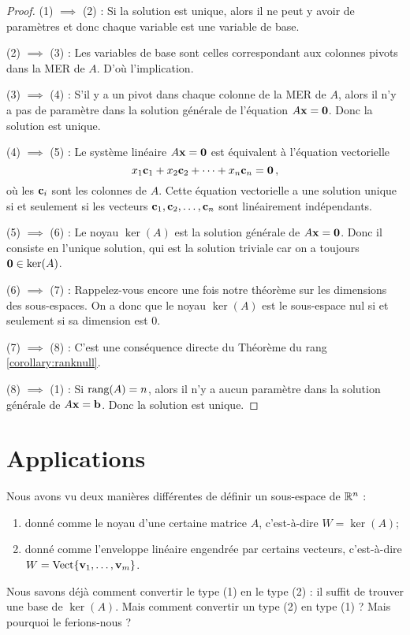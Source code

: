 \begin{proof}
(1) $\implies$ (2) : Si la solution est unique, alors il ne peut y avoir de paramètres et donc chaque variable est une variable de base.

(2) $\implies$ (3) : Les variables de base sont celles correspondant aux colonnes pivots dans la MER de $A$. D'où l'implication.

(3) $\implies$ (4) : S'il y a un pivot dans chaque colonne de la MER de $A$, alors il n'y a pas de paramètre dans la solution générale de l'équation $A\mathbf{x} = \mathbf{0}$. Donc la solution est unique.


(4) $\implies$ (5) : Le système linéaire $A\mathbf{x} = \mathbf{0}$ est \'equivalent à l'équation vectorielle
$$
x_1 \mathbf{c}_1 + x_2\mathbf{c}_2+ \cdots + x_n\mathbf{c}_n = \mathbf{0}\,,
$$
où les $\mathbf{c}_i$ sont les colonnes de $A$. 
Cette équation vectorielle a une solution unique si et seulement si les vecteurs $\mathbf{c}_1,\mathbf{c}_2, \ldots, \mathbf{c}_n$ sont linéairement indépendants.

(5) $\implies$ (6) : Le noyau $\ker(A)$ est la solution générale de $A\mathbf{x} = \mathbf{0}$. Donc il consiste en l'unique solution, qui est la solution triviale car on a toujours $\mathbf{0} \in \ker(A)$.

(6) $\implies$ (7) : Rappelez-vous encore une fois notre théorème sur les dimensions des sous-espaces. On a donc que le noyau $\ker(A)$ est le sous-espace nul si et seulement si sa dimension est $0$.

(7) $\implies$ (8) : C'est une conséquence directe du Théorème du rang \ref{corollary:ranknull}.


(8) $\implies$ (1) : Si $\textrm{rang} (A)=n$, alors il n'y a aucun paramètre dans la solution générale de $A \mathbf{x}=\mathbf{b}$. Donc la solution est unique.
\end{proof}

\section{Applications}
\label{section:subspacedescription}


Nous avons vu deux manières différentes de définir un sous-espace de $\mathbb{R}^n$ : 

\begin{enumerate}[(1)]
\item donné comme le noyau d'une certaine matrice $A$, c'est-à-dire $W=\ker(A)$;
\item donné comme l'enveloppe lin\'eaire engendr\'ee par certains vecteurs, c'est-à-dire $W=\operatorname{ Vect} \normalsize\{\mathbf{v}_1, \dots, \mathbf{v}_m\normalsize\}$.
\end{enumerate}
Nous savons déjà comment convertir le type (1) en le type (2) : il suffit de trouver une base de $\ker(A)$. Mais comment convertir un type (2) en type (1) ? 
Mais pourquoi le ferions-nous ? 

